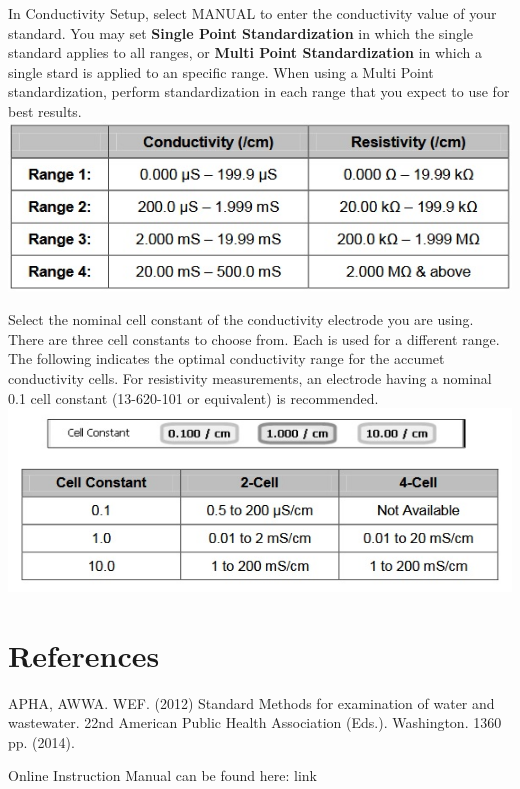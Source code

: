 \documentclass[12pt]{../SOP3_beta}\usepackage[]{graphicx}\usepackage[]{color}
\begin{document}
\NP In Conductivity Setup, select MANUAL to enter the conductivity value of your standard. You may set \textbf{Single Point Standardization} in which the single standard applies to all ranges, or \textbf{Multi Point Standardization} in which a single stard is applied to an specific range. When using a Multi Point standardization, perform standardization in each range that you expect to use for best results.
\NP\includegraphics{Conducivityranges.jpg}

 Select the nominal cell constant of the conductivity electrode you are using. There are three cell constants to choose from. Each is used for a different range. The following indicates the optimal conductivity range for the accumet conductivity cells. For resistivity measurements, an electrode having a nominal 0.1 cell constant (13-620-101 or equivalent) is recommended.
\includegraphics{CellConstant.jpg}

\section{References}

\NP APHA, AWWA. WEF. (2012) Standard Methods for examination of water and wastewater. 22nd American Public Health Association (Eds.). Washington. 1360 pp. (2014).

\NP Online Instruction Manual can be found here: link
\end{document}

